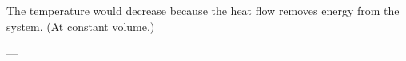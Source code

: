 The temperature would decrease because the heat flow removes energy from the system. (At constant volume.)

---